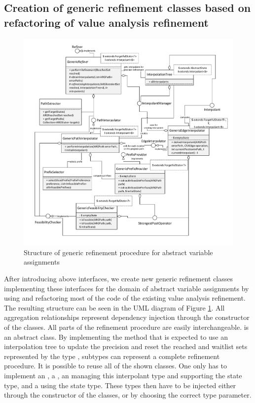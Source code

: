 \subsection{Creation of generic refinement classes based on refactoring of value analysis refinement}
\begin{figure}[h!]
\includegraphics[width=\linewidth]{implementationCegar/RefinementRefactored}
\caption{Structure of generic refinement procedure for abstract variable assignments}
\label{fig:refGeneric}
\end{figure}
After introducing above interfaces, we create new generic refinement classes implementing these interfaces for the domain of abstract variable assignments by using and refactoring most of the code of the existing value analysis refinement.
The resulting structure can be seen in the UML diagram of Figure \ref{fig:refGeneric}.
All aggregation relationships represent dependency injection through the constructor of the classes.
All parts of the refinement procedure are easily interchangeable.
 is an abstract class.
By implementing the method  that is expected to use an interpolation tree to update the precision and reset the reached and waitlist sets represented by the type , subtypes can represent a complete refinement procedure.
It is possible to reuse all of the shown classes.
One only has to implement an , a , an  managing this interpolant type and supporting the state type, and a  using the state type.
These types then have to be injected either through the constructor of the  classes, or by choosing the correct type parameter.
